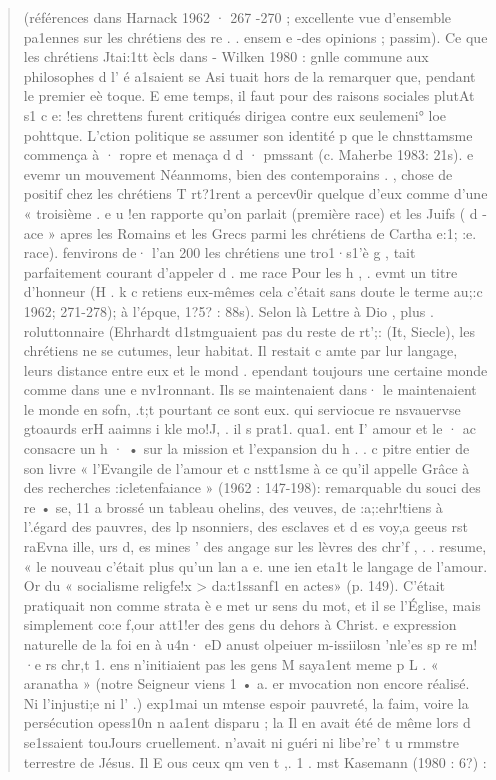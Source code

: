\begin{quote}
(références dans
    Harnack 1962 · 267 -270 ; excellente vue d'ensemble
pa1ennes sur les chrétiens des re . . ensem e -des opinions ;
passim). Ce que les chrétiens Jtai:1tt ècls dans - Wilken 1980 :
gnlle commune aux philosophes d l' é a1saient se Asi tuait hors de la
remarquer que, pendant le premier eè toque. E eme temps, il faut
pour des raisons sociales plutAt s1 c e: !es chrettens furent critiqués
dirigea contre eux seulemeni° loe pohttque. L'ction politique se
assumer son identité p que le chnsttamsme commença à
· ropre et menaça d d ·
pmssant (c. Maherbe 1983: 21s). e evemr un mouvement
Néanmoms, bien des contemporains . ,
chose de positif chez les chrétiens T rt?1rent a percev0ir quelque
d'eux comme d'une « troisième . e u !en rapporte qu'on parlait
(première race) et les Juifs ( d -ace » apres les Romains et les Grecs
parmi les chrétiens de Cartha e:1; :e. race). f\ux environs de· l'an 200
les chrétiens une tro1·s1'è g , tait parfaitement courant d'appeler
d
. me race Pour les h , .
evmt un titre d'honneur (H . k c retiens eux-mêmes cela
c'était sans doute le terme au;:c 1962; 271-278); à l'épque,
1?5? : 88s). Selon là Lettre à Dio , plus . roluttonnaire (Ehrhardt
d1stmguaient pas du reste de rt';: (It, Siecle), les chrétiens ne se
cutumes, leur habitat. Il restait c amte par lur langage, leurs
distance entre eux et le mond . ependant toujours une certaine
monde comme dans une e nv1ronnant. Ils se maintenaient dans· le
maintenaient le monde en sofn, .t;t pourtant ce sont eux. qui
serviocue re nsvauervse gtoaurds erH aaimns i kle mo!J, . il s prat1. qua1. ent I' amour et le
· ac consacre un h · •
sur la mission et l'expansion du h . . c pitre entier de son livre
« l'Evangile de l'amour et c nstt1sme à ce qu'il appelle
Grâce à des recherches :icletenfaiance » (1962 : 147-198):
remarquable du souci des re • se,
11
a brossé un tableau
ohelins, des veuves, de :a;:ehr!tiens à l'.égard des pauvres, des
lp nsonniers, des esclaves et d es voy,a geeus rst raEvna ille, urs d, es mines ' des
angage sur les lèvres des chr'f , . . resume, « le nouveau
c'était plus qu'un lan a e. une ien eta1t le langage de l'amour. Or
du « socialisme religfe!x > da:t1ssanf1 en actes» (p. 149). C'était
pratiquait non comme strata è e met ur sens du mot, et il se
l'Église, mais simplement co:e f,our att1!er des gens du dehors à
Christ. e expression naturelle de la foi en
à u4n· eD anust olpeiuer m-issiilosn 'nle'es sp re m!·e rs chr,t 1. ens n'initiaient pas les gens
M
saya1ent meme p L .
« aranatha » (notre Seigneur viens 1 • a. er mvocation
non encore réalisé. Ni l'injusti;e ni l' .) exp1mai un mtense espoir
pauvreté, la faim, voire la persécution opess10n n aa1ent disparu ; la
Il en avait été de même lors d se1ssaient touJours cruellement.
n'avait ni guéri ni libe're' t u rmmstre terrestre de Jésus. Il
E
ous ceux qm ven t ,. 1 .
mst Kasemann (1980 : 6?) :
\end{quote}

